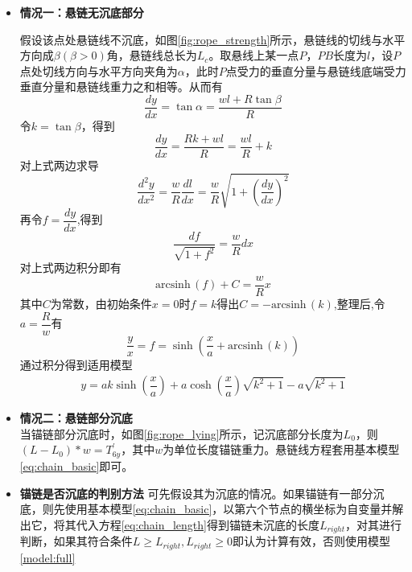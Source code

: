 \documentclass{cumcm}
\begin{document}
\begin{itemize}
\item \textbf{情况一：悬链无沉底部分}\par
假设该点处悬链线不沉底，如图\ref{fig:rope_strength}所示，悬链线的切线与水平方向成$\beta(\beta>0)$角，悬链线总长为$L_c$。取悬线上某一点$P$，$PB$长度为$l$，设$P$点处切线方向与水平方向夹角为$\alpha$，此时$P$点受力的垂直分量与悬链线底端受力垂直分量和悬链线重力之和相等。从而有
\begin{displaymath}
	\dfrac{dy}{dx}=\tan{\alpha}=\dfrac{wl+R\tan{\beta}}{R}
\end{displaymath}
令$k=\tan{\beta}$，得到
\begin{displaymath}
	\dfrac{dy}{dx}=\dfrac{Rk+wl}{R}=\dfrac{wl}{R}+k
\end{displaymath}
对上式两边求导
\begin{displaymath}
	\dfrac{d^2y}{dx^2}=\dfrac{w}{R}\dfrac{dl}{dx}=\dfrac{w}{R}\sqrt{1+(\dfrac{dy}{dx})^2}
\end{displaymath}
再令$f=\dfrac{dy}{dx}$,得到
\begin{displaymath}
	\dfrac{df}{\sqrt{1+f^2}}=\dfrac{w}{R}dx
\end{displaymath}
对上式两边积分即有
\newcommand{\arcsinh}{\mathrm{arcsinh}\,}
\begin{displaymath}
	\arcsinh(f)+C=\dfrac{w}{R}x
\end{displaymath}
其中$C$为常数，由初始条件$x=0$时$f=k$得出$C=-\arcsinh(k)$,整理后,令$a=\dfrac{R}{w}$有
\begin{displaymath}
	\dfrac{y}{x}=f=\sinh(\dfrac{x}{a}+\arcsinh(k))
\end{displaymath}
通过积分得到适用模型
\begin{align}
	y=ak\sinh(\dfrac{x}{a})+a\cosh(\dfrac{x}{a})\sqrt{k^2+1}-a\sqrt{k^2+1}\label{model:full}
\end{align}
\item \textbf{情况二：悬链部分沉底}\\
当锚链部分沉底时，如图\ref{fig:rope_lying}所示，记沉底部分长度为$L_0$，则$(L-L_0)*w=T_{6y}^{'}$，其中$w$为单位长度锚链重力。悬链线方程套用基本模型\ref{eq:chain_basic}即可。
\item \textbf{锚链是否沉底的判别方法}
可先假设其为沉底的情况。如果锚链有一部分沉底，则先使用基本模型\ref{eq:chain_basic}，以第六个节点的横坐标为自变量并解出它，将其代入方程\ref{eq:chain_length}得到锚链未沉底的长度$L_{right}$，对其进行判断，如果其符合条件$L \ge L_{right},L_{right} \ge 0$即认为计算有效，否则使用模型\ref{model:full} 
\end{itemize}\par 
\end{document}
